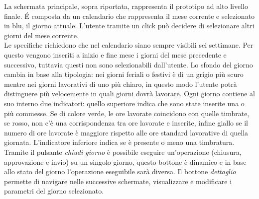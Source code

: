 \documentclass[12pt]{report}
\begin{document}
La schermata principale, sopra riportata, rappresenta il prototipo ad alto livello finale. É composta da un calendario che rappresenta il mese corrente e selezionato in blu, il giorno attuale. L'utente tramite un click può decidere di selezionare altri giorni del mese corrente. \\Le specifiche richiedono che nel calendario siano sempre visibili sei settimane. Per questo vengono inseriti a inizio e fine mese i giorni del mese precedente e successivo, tuttavia questi non sono selezionabili dall'utente. Lo sfondo del giorno cambia in base alla tipologia: nei giorni feriali o festivi è di un grigio più scuro mentre nei giorni lavorativi di uno più chiaro, in questo modo l'utente potrà distinguere più velocemente in quali giorni dovrà lavorare. Ogni giorno contiene al suo interno due indicatori: quello superiore indica che sono state inserite una o più commesse. Se di colore verde, le ore lavorate coincidono con quelle timbrate, se rosso, non c'è una corrispondenza tra ore lavorate e inserite, infine giallo se il numero di ore lavorate è maggiore rispetto alle ore standard lavorative di quella giornata. L'indicatore inferiore indica se è presente o meno una timbratura. Tramite il pulsante \textit{chiudi giorno} è possibile eseguire un'operazione (chiusura, approvazione e invio) su un singolo giorno, questo bottone è dinamico e in base allo stato del giorno l'operazione eseguibile sarà diversa. Il bottone \textit{dettaglio} permette di navigare nelle successive schermate, visualizzare e modificare i parametri del giorno selezionato.
\end{document}
